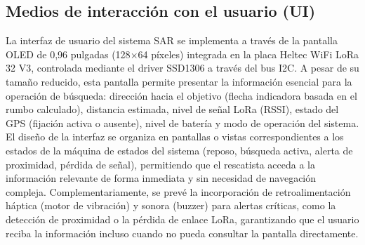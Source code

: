 \subsection{Medios de interacción con el usuario (UI)}

La interfaz de usuario del sistema SAR se implementa a través de la pantalla OLED de 0,96 pulgadas (128$\times$64 píxeles) integrada en la placa Heltec WiFi LoRa 32 V3, controlada mediante el driver SSD1306 a través del bus I2C. A pesar de su tamaño reducido, esta pantalla permite presentar la información esencial para la operación de búsqueda: dirección hacia el objetivo (flecha indicadora basada en el rumbo calculado), distancia estimada, nivel de señal LoRa (RSSI), estado del GPS (fijación activa o ausente), nivel de batería y modo de operación del sistema. El diseño de la interfaz se organiza en pantallas o vistas correspondientes a los estados de la máquina de estados del sistema (reposo, búsqueda activa, alerta de proximidad, pérdida de señal), permitiendo que el rescatista acceda a la información relevante de forma inmediata y sin necesidad de navegación compleja. Complementariamente, se prevé la incorporación de retroalimentación háptica (motor de vibración) y sonora (buzzer) para alertas críticas, como la detección de proximidad o la pérdida de enlace LoRa, garantizando que el usuario reciba la información incluso cuando no pueda consultar la pantalla directamente.